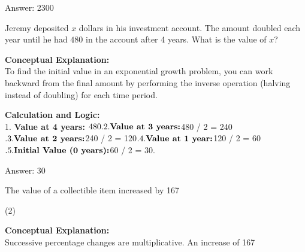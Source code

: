 \documentclass[11pt,paper=a4,answers]{exam}
\begin{document}
\begin{questions}
\begin{solution}
Answer: \colorbox{yellow!100}{2300}
\end{solution}

\vspace{60pt}

\question
Jeremy deposited $x$ dollars in his investment account. The amount doubled each year until he had $480$ in the account after 4 years. What is the value of $x$?

\begin{solution}
\textbf{Conceptual Explanation:} \\
To find the initial value in an exponential growth problem, you can work backward from the final amount by performing the inverse operation (halving instead of doubling) for each time period.

\vspace{30pt}

\textbf{Calculation and Logic:} \\
1. \textbf{Value at 4 years:} $480. \\
2. \textbf{Value at 3 years:} $480 / 2 = 240$. \\
3. \textbf{Value at 2 years:} $240 / 2 = 120$. \\
4. \textbf{Value at 1 year:} $120 / 2 = 60$. \\
5. \textbf{Initial Value (0 years):} $60 / 2 = 30.

\vspace{30pt}

Answer: \colorbox{yellow!100}{30}
\end{solution}

\vspace{60pt}

\question
The value of a collectible item increased by 167%
\begin{tasks}(2)
\end{tasks}

\begin{solution}
\textbf{Conceptual Explanation:} \\
Successive percentage changes are multiplicative. An increase of 167%


\end{solution}
\end{questions}
\end{document}
